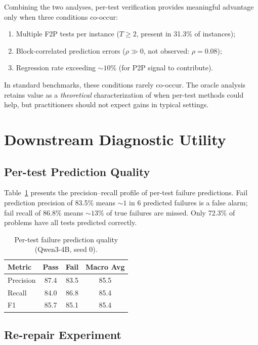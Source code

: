 \documentclass[11pt,a4paper]{article}
\begin{document}
Combining the two analyses, per-test verification provides meaningful advantage only when three conditions co-occur:
\begin{enumerate}
    \item Multiple F2P tests per instance ($T \geq 2$, present in 31.3\% of instances);
    \item Block-correlated prediction errors ($\rho \gg 0$, not observed: $\rho{=}0.08$);
    \item Regression rate exceeding ${\sim}10\%$ (for P2P signal to contribute).
\end{enumerate}
In standard benchmarks, these conditions rarely co-occur. The oracle analysis retains value as a \emph{theoretical} characterization of when per-test methods could help, but practitioners should not expect gains in typical settings.

\section{Downstream Diagnostic Utility}
\label{sec:diagnostic}

\subsection{Per-test Prediction Quality}

Table~\ref{tab:pertest_quality} presents the precision--recall profile of per-test failure predictions.
Fail prediction precision of 83.5\% means ${\sim}1$ in 6 predicted failures is a false alarm; fail recall of 86.8\% means ${\sim}13\%$ of true failures are missed.
Only 72.3\% of problems have all tests predicted correctly.

\begin{table}[t]
\centering
\small
\caption{Per-test failure prediction quality (Qwen3-4B, seed 0).}
\label{tab:pertest_quality}
\begin{tabular}{lccc}
\toprule
\textbf{Metric} & \textbf{Pass} & \textbf{Fail} & \textbf{Macro Avg} \\
\midrule
Precision & 87.4 & 83.5 & 85.5 \\
Recall & 84.0 & 86.8 & 85.4 \\
F1 & 85.7 & 85.1 & 85.4 \\
\bottomrule
\end{tabular}
\end{table}

\subsection{Re-repair Experiment}
\end{document}
